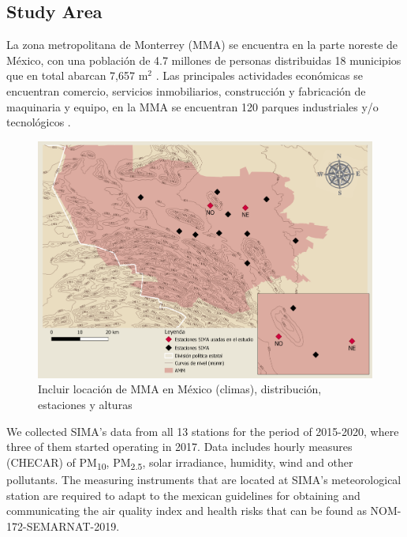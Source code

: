 \subsection{Study Area}
La zona metropolitana de Monterrey (MMA) se encuentra en la parte noreste de México, con una población de 4.7 millones de personas distribuidas 18 municipios que en total abarcan 7,657 m$^2$ \cite{inegi2015}. Las principales actividades económicas se encuentran comercio, servicios inmobiliarios, construcción y fabricación de maquinaria y equipo, en la MMA se encuentran 120 parques industriales y/o tecnológicos \cite{economia2015}.
\begin{figure}[H]
    \centering
    \includegraphics[scale=0.15]{images/map.png}
    \caption{Incluir locación de MMA en México (climas), distribución, estaciones y alturas}
    \label{fig:map}
\end{figure}
We collected SIMA’s data from all 13 stations for the period of 2015-2020, where three of them started operating in 2017. Data includes hourly measures (CHECAR) of PM\textsubscript{10}, PM\textsubscript{2.5}, solar irradiance, humidity, wind and other pollutants. The measuring instruments that are located at SIMA’s meteorological station are required to adapt to the mexican guidelines for obtaining and communicating the air quality index and health risks that can be found as NOM-172-SEMARNAT-2019.

